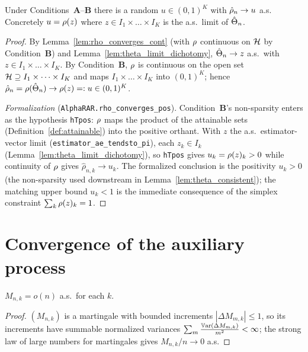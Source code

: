 \begin{lemma}\label{lem:rho_converges}
\leanok
{}
Under Conditions~\textbf{A}--\textbf{B} there is a random $u \in (0,1)^K$ with
$\hat{\rho}_n \to u$ a.s. Concretely $u = \rho(z)$ where $z\in I_1\times\dots\times I_K$
is the a.s.\ limit of $\hat{\Theta}_n$.
\end{lemma}

\begin{proof}\leanok
{}
By Lemma~\ref{lem:rho_converges_cont} (with $\rho$ continuous on $\mathcal{H}$ by Condition~\textbf{B})
and Lemma~\ref{lem:theta_limit_dichotomy}, $\hat{\Theta}_n \to z$ a.s.\ with
$z \in I_1\times\dots\times I_K$. By Condition~\textbf{B}, $\rho$ is
continuous on the open set $\mathcal{H} \supseteq I_1\times\dots\times I_K$ and maps
$I_1\times\dots\times I_K$ into $(0,1)^K$; hence
$\hat{\rho}_n = \rho(\hat{\Theta}_n) \to \rho(z) =: u \in (0,1)^K$.

\emph{Formalization} (\texttt{AlphaRAR.rho\_converges\_pos}). Condition~\textbf{B}'s non-sparsity
enters as the hypothesis \texttt{hTpos}: $\rho$ maps the product of the attainable sets
(Definition~\ref{def:attainable}) into the positive orthant. With $z$ the a.s.\ estimator-vector
limit (\texttt{estimator\_ae\_tendsto\_pi}), each $z_k\in I_k$
(Lemma~\ref{lem:theta_limit_dichotomy}), so \texttt{hTpos} gives $u_k=\rho(z)_k>0$ while
continuity of $\rho$ gives $\hat\rho_{n,k}\to u_k$. The formalized conclusion is the positivity
$u_k>0$ (the non-sparsity used downstream in Lemma~\ref{lem:theta_consistent}); the matching upper
bound $u_k<1$ is the immediate consequence of the simplex constraint $\sum_k\rho(z)_k=1$.
\end{proof}

\section{Convergence of the auxiliary process}
\label{sec:cons_U}

\begin{lemma}\label{lem:M_lln}
\leanok
{}
$M_{n,k} = o(n)$ a.s.\ for each $k$.
\end{lemma}

\begin{proof}\leanok
{}
$(M_{n,k})$ is a martingale with bounded increments $|\Delta M_{m,k}|\le1$, so its
increments have summable normalized variances $\sum_m \frac{\mathbb{V}\mathrm{ar}(\Delta M_{m,k})}{m^2}<\infty$;
the strong law of large numbers for martingales gives $M_{n,k}/n \to 0$ a.s.
\end{proof}

